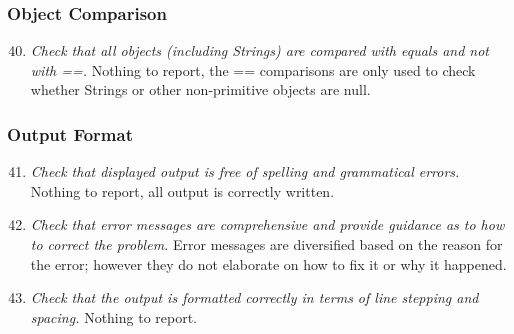 	\subsubsection{Object Comparison}
		\begin{enumerate}
			\setcounter{enumi}{39}
			\item \textit{Check that all objects (including Strings) are compared with equals and not with ==.}\newline
			Nothing to report, the == comparisons are only used to check whether Strings or other non-primitive objects are null. 
		\end{enumerate}

	\subsubsection{Output Format}
		\begin{enumerate}
			\setcounter{enumi}{40}
			\item \textit{Check that displayed output is free of spelling and grammatical errors.}\newline
			Nothing to report, all output is correctly written.%
			
			\item \textit{Check that error messages are comprehensive and provide guidance as to how to correct the problem.}\newline
			Error messages are diversified based on the reason for the error; however they do not elaborate on how to fix it or why it happened.

			\item \textit{Check that the output is formatted correctly in terms of line stepping and spacing.}\newline
			Nothing to report. %
			
		\end{enumerate}

